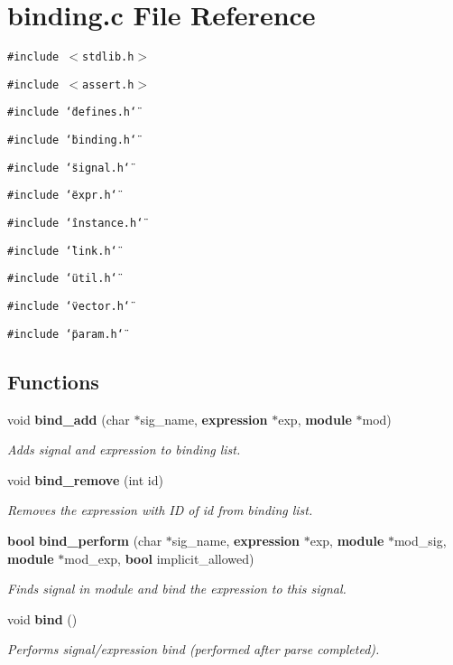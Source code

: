 \section{binding.c File Reference}
\label{binding_8c}
{\tt \#include $<$stdlib.h$>$}\par
{\tt \#include $<$assert.h$>$}\par
{\tt \#include \char`\"{}defines.h\char`\"{}}\par
{\tt \#include \char`\"{}binding.h\char`\"{}}\par
{\tt \#include \char`\"{}signal.h\char`\"{}}\par
{\tt \#include \char`\"{}expr.h\char`\"{}}\par
{\tt \#include \char`\"{}instance.h\char`\"{}}\par
{\tt \#include \char`\"{}link.h\char`\"{}}\par
{\tt \#include \char`\"{}util.h\char`\"{}}\par
{\tt \#include \char`\"{}vector.h\char`\"{}}\par
{\tt \#include \char`\"{}param.h\char`\"{}}\par
\subsection*{Functions}
\begin{CompactItemize}
\item 
void {\bf bind\_\-add} (char $\ast$sig\_\-name, {\bf expression} $\ast$exp, {\bf module} $\ast$mod)
\begin{CompactList}\small\item\em Adds signal and expression to binding list.\item\end{CompactList}\item 
void {\bf bind\_\-remove} (int id)
\begin{CompactList}\small\item\em Removes the expression with ID of id from binding list.\item\end{CompactList}\item 
{\bf bool} {\bf bind\_\-perform} (char $\ast$sig\_\-name, {\bf expression} $\ast$exp, {\bf module} $\ast$mod\_\-sig, {\bf module} $\ast$mod\_\-exp, {\bf bool} implicit\_\-allowed)
\begin{CompactList}\small\item\em Finds signal in module and bind the expression to this signal.\item\end{CompactList}\item 
void {\bf bind} ()
\begin{CompactList}\small\item\em Performs signal/expression bind (performed after parse completed).\item\end{CompactList}\end{CompactItemize}
